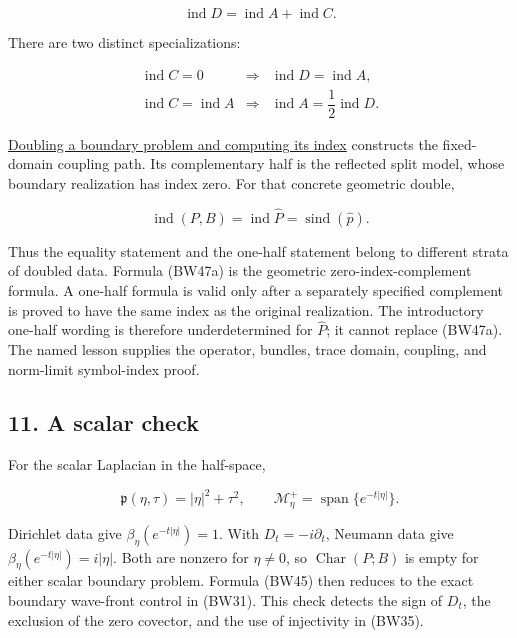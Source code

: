 \documentclass[
  11pt,
]{article}
\makeatletter
\let\ReaderOriginalAnchorStart\hyper@anchorstart
\let\ReaderOriginalAnchorEnd\hyper@anchorend
\let\ReaderPendingAliases\@empty
\def\ReaderArmAliases#1{\gdef\ReaderPendingAliases{#1}}
\def\hyper@anchorstart#1{\ReaderIfNativeAnchorTF{#1}{\ReaderPendingAliases\global\let\ReaderPendingAliases\@empty}{}\ReaderOriginalAnchorStart{#1}}
\makeatother
\begin{document}
\[
 \operatorname{ind}D
 =\operatorname{ind}A+\operatorname{ind}C.
 \tag{BW46}
\]

There are two distinct specializations:

\[
 \begin{array}{lll}
 \operatorname{ind}C=0
 &\Longrightarrow&
 \operatorname{ind}D=\operatorname{ind}A,\\[2mm]
 \operatorname{ind}C=\operatorname{ind}A
 &\Longrightarrow&
 \operatorname{ind}A=\dfrac12\operatorname{ind}D.
 \end{array}
 \tag{BW47}
\]

\href{split-doubling-boundary-index.pdf}{Doubling a boundary problem and
computing its index} constructs the fixed-domain coupling path. Its
complementary half is the reflected split model, whose boundary
realization has index zero. For that concrete geometric double,

\[
 \operatorname{ind}(P,B)=\operatorname{ind}\widehat P
 =\operatorname{sind}(\widehat p).
 \tag{BW47a}
\]

Thus the equality statement and the one-half statement belong to
different strata of doubled data. Formula (BW47a) is the geometric
zero-index-complement formula. A one-half formula is valid only after a
separately specified complement is proved to have the same index as the
original realization. The introductory one-half wording is therefore
underdetermined for \(\widehat P\); it cannot replace (BW47a). The named
lesson supplies the operator, bundles, trace domain, coupling, and
norm-limit symbol-index proof.

\ReaderArmAliases{\ReaderOriginalAnchorStart{AN03-BWF-011}\ReaderOriginalAnchorEnd\begingroup\expandafter\def\csname @currentHref\endcsname{AN03-BWF-011}\label{AN03-BWF-011}\endgroup\ReaderOriginalAnchorStart{11-a-scalar-check}\ReaderOriginalAnchorEnd\begingroup\expandafter\def\csname @currentHref\endcsname{11-a-scalar-check}\label{11-a-scalar-check}\endgroup}
\subsection{11. A scalar check}\label{a-scalar-check}

For the scalar Laplacian in the half-space,

\[
 \mathfrak p(\eta,\tau)=|\eta|^2+\tau^2,\qquad
 \mathscr M^+_{\eta}=\operatorname{span}\{e^{-t|\eta|}\}.
 \tag{BW48}
\]

Dirichlet data give \(\beta_\eta(e^{-t|\eta|})=1\). With
\(D_t=-i\partial_t\), Neumann data give
\(\beta_\eta(e^{-t|\eta|})=i|\eta|\). Both are nonzero for \(\eta\ne0\),
so \(\operatorname{Char}(P;B)\) is empty for either scalar boundary
problem. Formula (BW45) then reduces to the exact boundary wave-front
control in (BW31). This check detects the sign of \(D_t\), the exclusion
of the zero covector, and the use of injectivity in (BW35).
\end{document}
